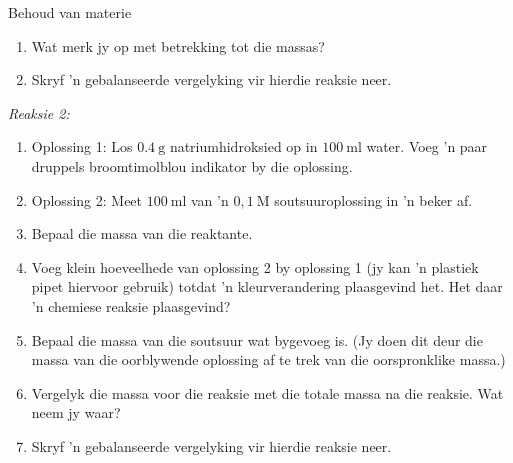 \begin{i_experiment}{Behoud van materie}
\begin{minipage}{.6\textwidth}
\begin{enumerate}[noitemsep, label=\textbf{\arabic*}. ]
\item Wat merk jy op met betrekking tot die massas?
\item Skryf 'n gebalanseerde vergelyking vir hierdie reaksie neer.
\end{enumerate}
\end{minipage}
\begin{minipage}{.4\textwidth}
 \begin{center}
 \end{center}
\end{minipage}
\begin{minipage}{.6\textwidth}
\textsl{Reaksie 2:}
\label{m38711*id63452}\begin{enumerate}[noitemsep, label=\textbf{\arabic*}. ] 
\item Oplossing 1: Los $0.4~\text{g}$ natriumhidroksied op in $100~\text{ml}$ water. Voeg 'n paar druppels broomtimolblou indikator by die oplossing. 
\item Oplossing 2: Meet $100~\text{ml}$ van 'n $0,1~\text{M}$ soutsuuroplossing in 'n beker af. 
\item Bepaal die massa van die reaktante.
\item Voeg klein hoeveelhede van oplossing 2 by oplossing 1 (jy kan 'n plastiek pipet hiervoor gebruik) totdat 'n kleurverandering plaasgevind het. Het daar 'n chemiese reaksie plaasgevind? 
\item Bepaal die massa van die soutsuur wat bygevoeg is. (Jy doen dit deur die massa van die oorblywende oplossing af te trek van die oorspronklike massa.)
\item Vergelyk die massa voor die reaksie met die totale massa na die reaksie. Wat neem jy waar?
\item Skryf 'n gebalanseerde vergelyking vir hierdie reaksie neer.
\end{enumerate}
\end{minipage}
\begin{minipage}{.4\textwidth}
 \begin{center}
\end{center}
\end{minipage}
\end{i_experiment}

